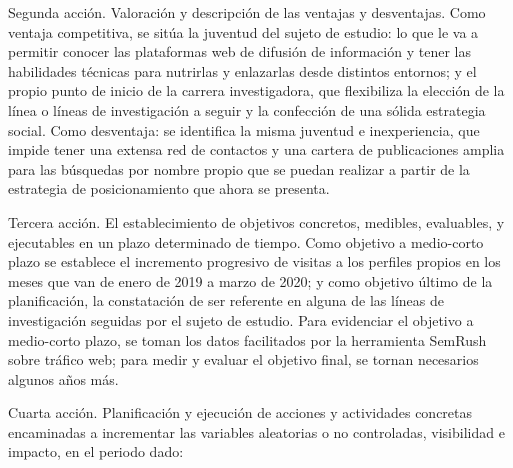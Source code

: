 \documentclass{textolivre}
\begin{document}
Segunda acción. Valoración y descripción de las ventajas y desventajas. Como ventaja competitiva, se sitúa la juventud del sujeto de estudio: lo que le va a permitir conocer las plataformas web de difusión de información y tener las habilidades técnicas para nutrirlas y enlazarlas desde distintos entornos; y el propio punto de inicio de la carrera investigadora, que flexibiliza la elección de la línea o líneas de investigación a seguir y la confección de una sólida estrategia social. Como desventaja: se identifica la misma juventud e inexperiencia, que impide tener una extensa red de contactos y una cartera de publicaciones amplia para las búsquedas por nombre propio que se puedan realizar a partir de la estrategia de posicionamiento que ahora se presenta.

Tercera acción. El establecimiento de objetivos concretos, medibles, evaluables, y ejecutables en un plazo determinado de tiempo. Como objetivo a medio-corto plazo se establece el incremento progresivo de visitas a los perfiles propios en los meses que van de enero de 2019 a marzo de 2020; y como objetivo último de la planificación, la constatación de ser referente en alguna de las líneas de investigación seguidas por el sujeto de estudio. Para evidenciar el objetivo a medio-corto plazo, se toman los datos facilitados por la herramienta SemRush sobre tráfico web; para medir y evaluar el objetivo final, se tornan necesarios algunos años más.

Cuarta acción. Planificación y ejecución de acciones y actividades concretas encaminadas a incrementar las variables aleatorias o no controladas, visibilidad e impacto, en el periodo dado:
\end{document}

